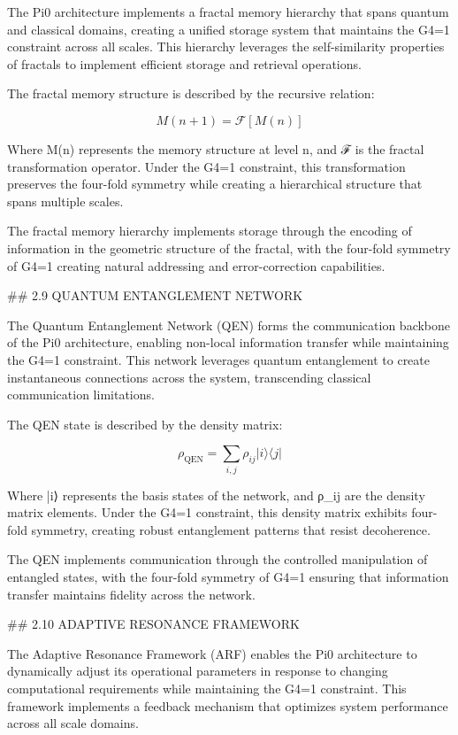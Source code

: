 The Pi0 architecture implements a fractal memory hierarchy that spans quantum and classical domains, creating a unified storage system that maintains the G4=1 constraint across all scales. This hierarchy leverages the self-similarity properties of fractals to implement efficient storage and retrieval operations.

The fractal memory structure is described by the recursive relation:

$$M(n+1) = \mathcal{F}[M(n)]$$

Where M(n) represents the memory structure at level n, and ℱ is the fractal transformation operator. Under the G4=1 constraint, this transformation preserves the four-fold symmetry while creating a hierarchical structure that spans multiple scales.

The fractal memory hierarchy implements storage through the encoding of information in the geometric structure of the fractal, with the four-fold symmetry of G4=1 creating natural addressing and error-correction capabilities.

## 2.9 QUANTUM ENTANGLEMENT NETWORK

The Quantum Entanglement Network (QEN) forms the communication backbone of the Pi0 architecture, enabling non-local information transfer while maintaining the G4=1 constraint. This network leverages quantum entanglement to create instantaneous connections across the system, transcending classical communication limitations.

The QEN state is described by the density matrix:

$$\rho_{\text{QEN}} = \sum_{i,j} \rho_{ij} |i\rangle\langle j|$$

Where |i⟩ represents the basis states of the network, and ρ_ij are the density matrix elements. Under the G4=1 constraint, this density matrix exhibits four-fold symmetry, creating robust entanglement patterns that resist decoherence.

The QEN implements communication through the controlled manipulation of entangled states, with the four-fold symmetry of G4=1 ensuring that information transfer maintains fidelity across the network.

## 2.10 ADAPTIVE RESONANCE FRAMEWORK

The Adaptive Resonance Framework (ARF) enables the Pi0 architecture to dynamically adjust its operational parameters in response to changing computational requirements while maintaining the G4=1 constraint. This framework implements a feedback mechanism that optimizes system performance across all scale domains.

